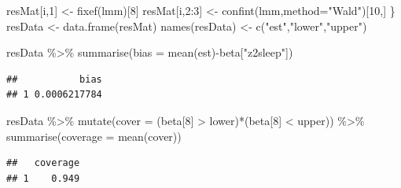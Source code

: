 \documentclass[
]{article}
\newenvironment{Shaded}{\begin{snugshade}}{\end{snugshade}}
\newcommand{\AttributeTok}[1]{\textcolor[rgb]{0.77,0.63,0.00}{#1}}
\newcommand{\DecValTok}[1]{\textcolor[rgb]{0.00,0.00,0.81}{#1}}
\newcommand{\FunctionTok}[1]{\textcolor[rgb]{0.00,0.00,0.00}{#1}}
\newcommand{\NormalTok}[1]{#1}
\newcommand{\OtherTok}[1]{\textcolor[rgb]{0.56,0.35,0.01}{#1}}
\newcommand{\SpecialCharTok}[1]{\textcolor[rgb]{0.00,0.00,0.00}{#1}}
\newcommand{\StringTok}[1]{\textcolor[rgb]{0.31,0.60,0.02}{#1}}
\begin{document}
\begin{Shaded}
\begin{Highlighting}[]
\NormalTok{resMat[i,}\DecValTok{1}\NormalTok{] }\OtherTok{\textless{}{-}} \FunctionTok{fixef}\NormalTok{(lmm)[}\DecValTok{8}\NormalTok{]}
\NormalTok{resMat[i,}\DecValTok{2}\SpecialCharTok{:}\DecValTok{3}\NormalTok{] }\OtherTok{\textless{}{-}} \FunctionTok{confint}\NormalTok{(lmm,}\AttributeTok{method=}\StringTok{"Wald"}\NormalTok{)[}\DecValTok{10}\NormalTok{,]}
\NormalTok{\}}
\NormalTok{resData }\OtherTok{\textless{}{-}} \FunctionTok{data.frame}\NormalTok{(resMat)}
\FunctionTok{names}\NormalTok{(resData) }\OtherTok{\textless{}{-}} \FunctionTok{c}\NormalTok{(}\StringTok{"est"}\NormalTok{,}\StringTok{"lower"}\NormalTok{,}\StringTok{"upper"}\NormalTok{)}
\end{Highlighting}
\end{Shaded}

\begin{Shaded}
\begin{Highlighting}[]
\NormalTok{resData }\SpecialCharTok{\%\textgreater{}\%} \FunctionTok{summarise}\NormalTok{(}\AttributeTok{bias =} \FunctionTok{mean}\NormalTok{(est)}\SpecialCharTok{{-}}\NormalTok{beta[}\StringTok{"z2sleep"}\NormalTok{])}
\end{Highlighting}
\end{Shaded}

\begin{verbatim}
##           bias
## 1 0.0006217784
\end{verbatim}

\begin{Shaded}
\begin{Highlighting}[]
\NormalTok{resData }\SpecialCharTok{\%\textgreater{}\%} \FunctionTok{mutate}\NormalTok{(}\AttributeTok{cover =}\NormalTok{ (beta[}\DecValTok{8}\NormalTok{] }\SpecialCharTok{\textgreater{}}\NormalTok{ lower)}\SpecialCharTok{*}\NormalTok{(beta[}\DecValTok{8}\NormalTok{] }\SpecialCharTok{\textless{}}\NormalTok{ upper)) }\SpecialCharTok{\%\textgreater{}\%} \FunctionTok{summarise}\NormalTok{(}\AttributeTok{coverage =} \FunctionTok{mean}\NormalTok{(cover))}
\end{Highlighting}
\end{Shaded}

\begin{verbatim}
##   coverage
## 1    0.949
\end{verbatim}
\end{document}
